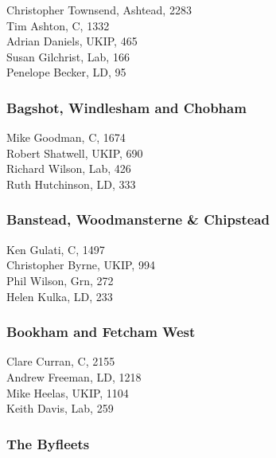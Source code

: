 \documentclass[a4paper,openany,10pt]{book}
\begin{document}


Christopher Townsend, Ashtead, 2283\\
Tim Ashton, C, 1332\\
Adrian Daniels, UKIP, 465\\
Susan Gilchrist, Lab, 166\\
Penelope Becker, LD, 95\\


\subsubsection*{{Bagshot, Windlesham and Chobham}}



Mike Goodman, C, 1674\\
Robert Shatwell, UKIP, 690\\
Richard Wilson, Lab, 426\\
Ruth Hutchinson, LD, 333\\


\subsubsection*{Banstead, Woodmansterne \& Chipstead}



Ken Gulati, C, 1497\\
Christopher Byrne, UKIP, 994\\
Phil Wilson, Grn, 272\\
Helen Kulka, LD, 233\\


\subsubsection*{Bookham and Fetcham West}



Clare Curran, C, 2155\\
Andrew Freeman, LD, 1218\\
Mike Heelas, UKIP, 1104\\
Keith Davis, Lab, 259\\


\subsubsection*{The Byfleets}
\end{document}
